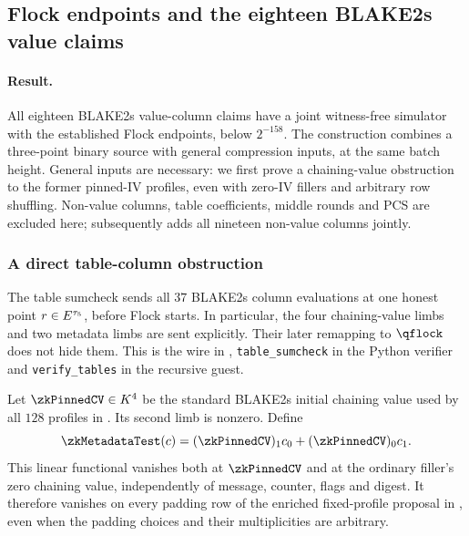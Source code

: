 \subsection{Flock endpoints and the eighteen BLAKE2s value claims}\label{note:zk-flock-interface}

\paragraph{Result.} All eighteen BLAKE2s value-column claims have a joint witness-free simulator with the established Flock endpoints, below $2^{-158}$. The construction combines a three-point binary source with general compression inputs, at the same batch height. General inputs are necessary: we first prove a chaining-value obstruction to the former pinned-IV profiles, even with zero-IV fillers and arbitrary row shuffling. Non-value columns, table coefficients, middle rounds and PCS are excluded here;  subsequently adds all nineteen non-value columns jointly.

\subsubsection{A direct table-column obstruction}

The table sumcheck sends all $37$ BLAKE2s column evaluations at one honest point $r\in E^{\tau_5}$, before Flock starts. In particular, the four chaining-value limbs and two metadata limbs are sent explicitly. Their later remapping to $\qflock$ does not hide them. This is the wire in , \texttt{table\_sumcheck} in the Python verifier and \texttt{verify\_tables} in the recursive guest.

Let $\zkPinnedCV\in\K^4$ be the standard BLAKE2s initial chaining value used by all $128$ profiles in . Its second limb is nonzero. Define
\[
 \zkMetadataTest(c)=(\zkPinnedCV)_1 c_0+(\zkPinnedCV)_0 c_1.
\]
This linear functional vanishes both at $\zkPinnedCV$ and at the ordinary filler's zero chaining value, independently of message, counter, flags and digest. It therefore vanishes on every padding row of the enriched fixed-profile proposal in , even when the padding choices and their multiplicities are arbitrary.

